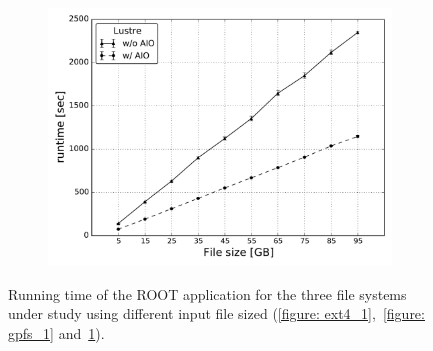 \begin{figure}[]
\begin{subfigure}[]{0.70\textwidth}
    \includegraphics[width=\textwidth]{figures/Lustre/runtime}
    \caption{\textit{}}
    \label{figure: lustre_1}
  \end{subfigure}
  \caption{Running time of the ROOT application for the three file systems under study using different input file sized (\ref{figure: ext4_1},~\ref{figure: gpfs_1} and~\ref{figure: lustre_1}).}
  \label{figure: run-time_1}
\end{figure}

